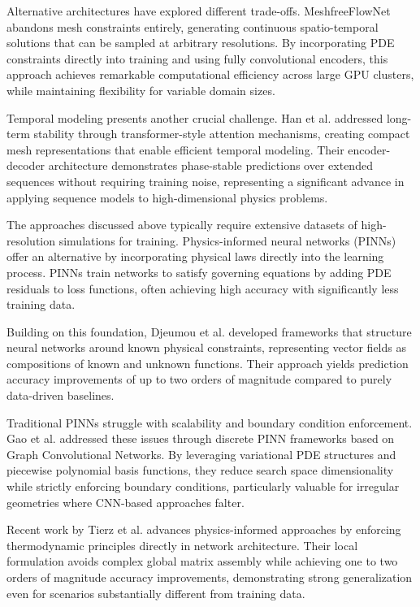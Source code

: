 Alternative architectures have explored different trade-offs. MeshfreeFlowNet \cite{jiangMeshfreeFlowNetPhysicsConstrainedDeep2020} abandons mesh constraints entirely, generating continuous spatio-temporal solutions that can be sampled at arbitrary resolutions. By incorporating PDE constraints directly into training and using fully convolutional encoders, this approach achieves remarkable computational efficiency across large GPU clusters, while maintaining flexibility for variable domain sizes.

Temporal modeling presents another crucial challenge. Han et al. \cite{hanPredictingPhysicsMeshreduced2022a} addressed long-term stability through transformer-style attention mechanisms, creating compact mesh representations that enable efficient temporal modeling. Their encoder-decoder architecture demonstrates phase-stable predictions over extended sequences without requiring training noise, representing a significant advance in applying sequence models to high-dimensional physics problems.

The approaches discussed above typically require extensive datasets of high-resolution simulations for training. Physics-informed neural networks (PINNs) \cite{raissi2024physicsinformedneuralnetworksextensions} offer an alternative by incorporating physical laws directly into the learning process. PINNs train networks to satisfy governing equations by adding PDE residuals to loss functions, often achieving high accuracy with significantly less training data.

Building on this foundation, Djeumou et al. \cite{djeumouNeuralNetworksPhysicsInformed2022} developed frameworks that structure neural networks around known physical constraints, representing vector fields as compositions of known and unknown functions. Their approach yields prediction accuracy improvements of up to two orders of magnitude compared to purely data-driven baselines.

Traditional PINNs struggle with scalability and boundary condition enforcement. Gao et al. \cite{gaoPhysicsinformedGraphNeural2022} addressed these issues through discrete PINN frameworks based on Graph Convolutional Networks. By leveraging variational PDE structures and piecewise polynomial basis functions, they reduce search space dimensionality while strictly enforcing boundary conditions, particularly valuable for irregular geometries where CNN-based approaches falter.

Recent work by Tierz et al. \cite{Tierz_Alfaro_González_Chinesta_Cueto_2025} advances physics-informed approaches by enforcing thermodynamic principles directly in network architecture. Their local formulation avoids complex global matrix assembly while achieving one to two orders of magnitude accuracy improvements, demonstrating strong generalization even for scenarios substantially different from training data.


